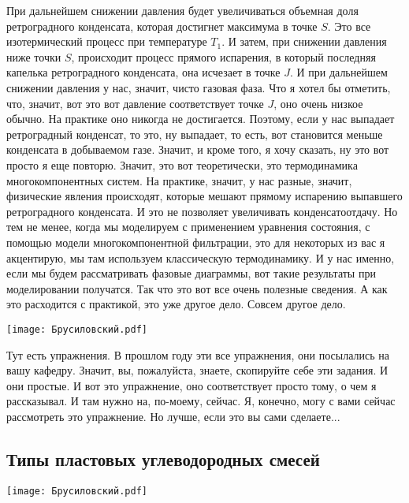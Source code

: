 \documentclass[main.tex]{subfiles}
\begin{document}
При дальнейшем снижении давления будет увеличиваться объемная доля ретроградного конденсата, которая достигнет максимума в точке $S$.
Это все изотермический процесс при температуре $T_1$.
И затем, при снижении давления ниже точки $S$, происходит процесс прямого испарения, в который последняя капелька ретроградного конденсата, она исчезает в точке $J$.
И при дальнейшем снижении давления у нас, значит, чисто газовая фаза.
Что я хотел бы отметить, что, значит, вот это вот давление соответствует точке $J$, оно очень низкое обычно.
На практике оно никогда не достигается.
Поэтому, если у нас выпадает ретроградный конденсат, то это, ну выпадает, то есть, вот становится меньше конденсата в добываемом газе.
Значит, и кроме того, я хочу сказать, ну это вот просто я еще повторю.
Значит, это вот теоретически, это термодинамика многокомпонентных систем.
На практике, значит, у нас разные, значит, физические явления происходят, которые мешают прямому испарению выпавшего ретроградного конденсата.
И это не позволяет увеличивать конденсатоотдачу.
Но тем не менее, когда мы моделируем с применением уравнения состояния, с помощью модели многокомпонентной фильтрации, это для некоторых из вас я акцентирую, мы там используем классическую термодинамику.
И у нас именно, если мы будем рассматривать фазовые диаграммы, вот такие результаты при моделировании получатся.
Так что это вот все очень полезные сведения.
А как это расходится с практикой, это уже другое дело.
Совсем другое дело.

\begin{center}
\texttt{[image: Брусиловский.pdf]}
\end{center}

Тут есть упражнения.
В прошлом году эти все упражнения, они посылались на вашу
кафедру.
Значит, вы, пожалуйста, знаете, скопируйте себе эти задания.
И они простые.
И вот это упражнение, оно соответствует просто тому, о чем я рассказывал.
И там нужно на, по-моему, сейчас.
Я, конечно, могу с вами сейчас рассмотреть это упражнение.
Но лучше, если это вы сами сделаете...

\subsection{Типы пластовых углеводородных смесей}

\begin{center}
\texttt{[image: Брусиловский.pdf]}
\end{center}
\end{document}
